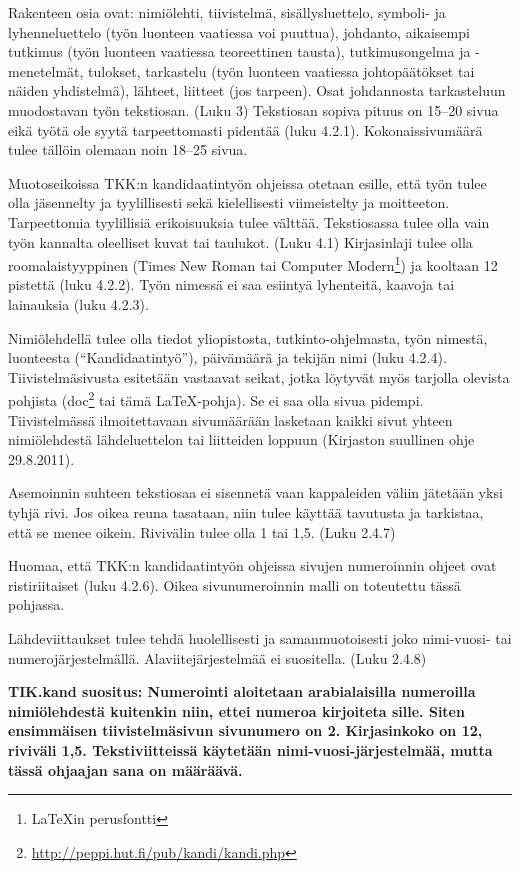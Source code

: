 Rakenteen osia ovat: nimiölehti, tiivistelmä, sisällysluettelo,
symboli- ja lyhenneluettelo (työn luonteen vaatiessa voi puuttua),
johdanto, aikaisempi tutkimus (työn luonteen vaatiessa teoreettinen
tausta), tutkimusongelma ja -menetelmät, tulokset, tarkastelu (työn
luonteen vaatiessa johtopäätökset tai näiden yhdistelmä), lähteet,
liitteet (jos tarpeen). Osat johdannosta tarkasteluun muodostavan työn
tekstiosan. (Luku 3) Tekstiosan sopiva pituus on 15--20 sivua eikä
työtä ole syytä tarpeettomasti pidentää (luku 4.2.1).
Kokonaissivumäärä tulee tällöin olemaan noin 18--25 sivua.

Muotoseikoissa TKK:n kandidaatintyön ohjeissa otetaan esille, että
työn tulee olla jäsennelty ja tyylillisesti sekä kielellisesti
viimeistelty ja moitteeton.  Tarpeettomia tyylillisiä erikoisuuksia
tulee välttää.  Tekstiosassa tulee olla vain työn kannalta oleelliset
kuvat tai taulukot. (Luku 4.1)
%
Kirjasinlaji tulee olla roomalaistyyppinen (Times New Roman
tai Computer Modern\footnote{\LaTeX{}in perusfontti}) ja kooltaan 12 pistettä
(luku 4.2.2). 
%
Työn nimessä ei saa esiintyä lyhenteitä, kaavoja tai lainauksia
(luku 4.2.3).

Nimiölehdellä tulee olla tiedot yliopistosta, tutkinto-ohjelmasta,
työn nimestä, luonteesta (``Kandidaatintyö''), päivämäärä ja tekijän
nimi (luku 4.2.4). Tiivistelmäsivusta esitetään vastaavat seikat,
jotka löytyvät myös tarjolla olevista pohjista
(doc\footnote{\url{http://peppi.hut.fi/pub/kandi/kandi.php}} tai tämä
\LaTeX{}-pohja).  Se ei saa olla sivua pidempi. 
Tiivistelmässä
ilmoitettavaan sivumäärään lasketaan kaikki sivut yhteen 
nimiölehdestä lähdeluettelon tai liitteiden loppuun
(Kirjaston suullinen ohje 29.8.2011). 

Asemoinnin suhteen tekstiosaa ei sisennetä vaan kappaleiden väliin
jätetään yksi tyhjä rivi. Jos oikea reuna tasataan, niin tulee käyttää
tavutusta ja tarkistaa, että se menee oikein.  Rivivälin tulee olla 1
tai 1,5. (Luku 2.4.7)

Huomaa, että TKK:n kandidaatintyön ohjeissa sivujen numeroinnin ohjeet
ovat ristiriitaiset (luku 4.2.6). Oikea sivunumeroinnin malli on
toteutettu tässä pohjassa.  

Lähdeviittaukset tulee tehdä huolellisesti ja samanmuotoisesti joko
nimi-vuosi- tai numerojärjestelmällä. Alaviitejärjestelmää ei
suositella. (Luku 2.4.8)

\textbf{TIK.kand suositus: Numerointi aloitetaan arabialaisilla
  numeroilla nimiölehdestä kuitenkin niin, ettei numeroa kirjoiteta
  sille. Siten ensimmäisen tiivistelmäsivun sivunumero on 2. 
  Kirjasinkoko on 12, riviväli 1,5. Tekstiviitteissä käytetään
  nimi-vuosi-järjestelmää, mutta tässä ohjaajan sana on määräävä.}

